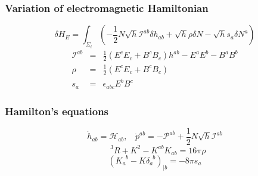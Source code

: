 \documentclass{article}
\begin{document}
\subsubsection{Variation of electromagnetic Hamiltonian}
\[\delta H_E = \int_{\Sigma_t}(-\frac{1}{2}N\sqrt{h}\mathcal{I}^{ab} \delta h_{ab} + \sqrt{h} \rho \delta N - \sqrt{h} s_a \delta N^a)\]
\begin{eqnarray}
\mathcal{I}^{ab} &=& \frac{1}{2}(E^c E_c + B^c B_c)h^{ab} - E^a E^b - B^a B^b \nonumber \\
\rho &=& \frac{1}{2}(E^c E_c + B^c B_c) \nonumber \\
s_a &=& \epsilon_{abc} E^b B^c \nonumber
\end{eqnarray}

\subsubsection{Hamilton's equations}
\[\dot{h}_{ab} = \mathcal{H}_{ab}, \ \ \ \ \dot{p}^{ab} = -\mathcal{P}^{ab}+\frac{1}{2}N\sqrt{h}\mathcal{I}^{ab}\]
\[\phantom{R}^3R + K^2 - K^{ab}K_{ab} = 16 \pi \rho\]
\[(K_a^{\phantom{a}b} - K \delta_a^{\phantom{a}b})_{|b} = -8\pi s_a\]
\end{document}
